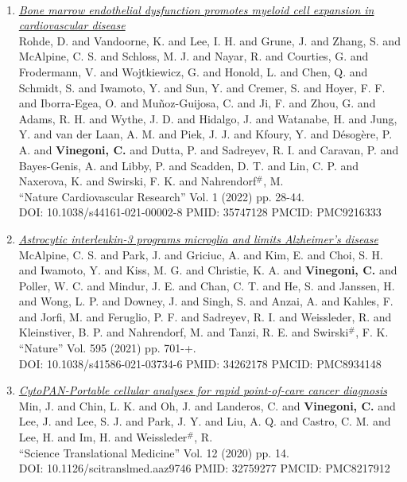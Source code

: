 \documentclass{resume}
\begin{document}
\begin{category}{~~}
\begin{enumerate}
\item \href{https://cvinegoni.github.io/assets/pdf/papers/2022-NCR-1.pdf}{\it  Bone marrow endothelial dysfunction promotes myeloid cell expansion in cardiovascular disease} \\ Rohde, D. and Vandoorne, K. and Lee, I. H. and Grune, J. and Zhang, S. and McAlpine, C. S. and Schloss, M. J. and Nayar, R. and Courties, G. and Frodermann, V. and Wojtkiewicz, G. and Honold, L. and Chen, Q. and Schmidt, S. and Iwamoto, Y. and Sun, Y. and Cremer, S. and Hoyer, F. F. and Iborra-Egea, O. and Muñoz-Guijosa, C. and Ji, F. and Zhou, G. and Adams, R. H. and Wythe, J. D. and Hidalgo, J. and Watanabe, H. and Jung, Y. and van der Laan, A. M. and Piek, J. J. and Kfoury, Y. and Désogère, P. A. and {\bf Vinegoni, C.} and Dutta, P. and Sadreyev, R. I. and Caravan, P. and Bayes-Genis, A. and Libby, P. and Scadden, D. T. and Lin, C. P. and Naxerova, K. and Swirski, F. K. and Nahrendorf$^\#$, M. \\ ``Nature Cardiovascular Research'' Vol. 1 (2022) pp. 28-44. \\ DOI: 10.1038/s44161-021-00002-8 PMID: 35747128 PMCID: PMC9216333

\item \href{https://cvinegoni.github.io/assets/pdf/papers/2021-NATURE.pdf}{\it  Astrocytic interleukin-3 programs microglia and limits Alzheimer's disease} \\ McAlpine, C. S. and Park, J. and Griciuc, A. and Kim, E. and Choi, S. H. and Iwamoto, Y. and Kiss, M. G. and Christie, K. A. and {\bf Vinegoni, C.} and Poller, W. C. and Mindur, J. E. and Chan, C. T. and He, S. and Janssen, H. and Wong, L. P. and Downey, J. and Singh, S. and Anzai, A. and Kahles, F. and Jorfi, M. and Feruglio, P. F. and Sadreyev, R. I. and Weissleder, R. and Kleinstiver, B. P. and Nahrendorf, M. and Tanzi, R. E. and Swirski$^\#$, F. K. \\ ``Nature'' Vol. 595 (2021) pp. 701-+. \\ DOI: 10.1038/s41586-021-03734-6 PMID: 34262178 PMCID: PMC8934148

\item \href{https://cvinegoni.github.io/assets/pdf/papers/2020-STM.pdf}{\it  CytoPAN-Portable cellular analyses for rapid point-of-care cancer diagnosis} \\ Min, J. and Chin, L. K. and Oh, J. and Landeros, C. and {\bf Vinegoni, C.} and Lee, J. and Lee, S. J. and Park, J. Y. and Liu, A. Q. and Castro, C. M. and Lee, H. and Im, H. and Weissleder$^\#$, R. \\ ``Science Translational Medicine'' Vol. 12 (2020) pp. 14. \\ DOI: 10.1126/scitranslmed.aaz9746 PMID: 32759277 PMCID: PMC8217912


\end{enumerate}
\end{category}
\end{document}
